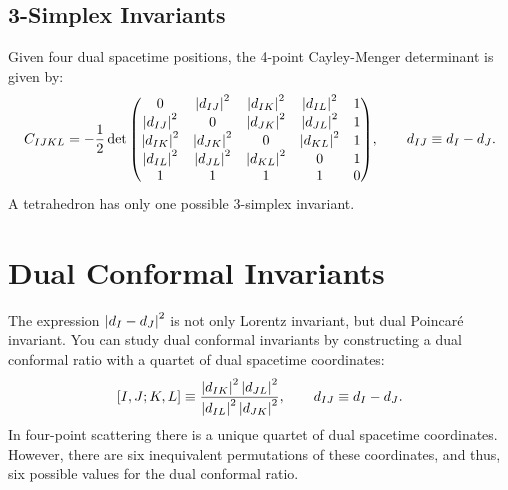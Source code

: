 \subsection{3-Simplex Invariants}
Given four dual spacetime positions, the 4-point Cayley-Menger determinant is given by:
\begin{equation}
	C_{IJKL} = -\frac{1}{2} \det{
	\begin{pmatrix}
	0 & \left\lvert d_{IJ} \right\rvert^{2} & \left\lvert d_{IK} \right\rvert^{2} & \left\lvert d_{IL} \right\rvert^{2} & 1 \\
	\left\lvert d_{IJ} \right\rvert^{2} & 0 & \left\lvert d_{JK} \right\rvert^{2} & \left\lvert d_{JL} \right\rvert^{2} & 1 \\
	\left\lvert d_{IK} \right\rvert^{2} & \left\lvert d_{JK} \right\rvert^{2} & 0 & \left\lvert d_{KL} \right\rvert^{2} & 1 \\
	\left\lvert d_{IL} \right\rvert^{2} & \left\lvert d_{JL} \right\rvert^{2} & \left\lvert d_{KL} \right\rvert^{2} & 0 & 1 \\
	1 & 1 & 1 & 1 & 0
	\end{pmatrix}
	}, \qquad d_{IJ} \equiv d_{I} - d_{J}.
\end{equation}
A tetrahedron has only one possible 3-simplex invariant.
\section{Dual Conformal Invariants}
The expression $\left\lvert d_{I} - d_{J} \right\rvert^{2}$ is not only Lorentz invariant, but dual Poincar\'{e} invariant. You can study dual conformal invariants by constructing a dual conformal ratio with a quartet of dual spacetime coordinates:
\begin{equation}
	\left[ I , J ; K , L \right] \equiv \frac{\left\lvert d_{IK} \right\rvert^{2} \left\lvert d_{JL} \right\rvert^{2}}{\left\lvert d_{IL} \right\rvert^{2} \left\lvert d_{JK} \right\rvert^{2}}, \qquad d_{IJ} \equiv d_{I} - d_{J}.
\end{equation}
In four-point scattering there is a unique quartet of dual spacetime coordinates. However, there are six inequivalent permutations of these coordinates, and thus, six possible values for the dual conformal ratio.
